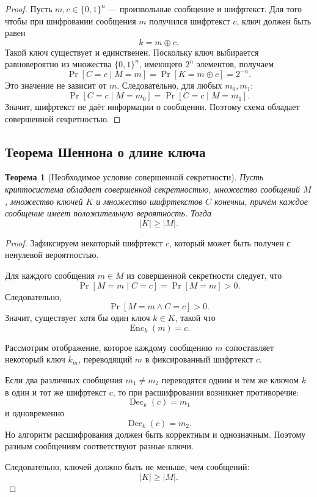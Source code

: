 \documentclass[12pt,a4paper]{article}
\newtheorem{theorem}{Теорема}
\DeclareMathOperator{\Enc}{Enc}
\DeclareMathOperator{\Dec}{Dec}
\begin{document}
\begin{proof}
Пусть $m,c \in \{0,1\}^n$ --- произвольные сообщение и шифртекст. Для того чтобы при шифровании сообщения $m$ получился шифртекст $c$, ключ должен быть равен
\[
    k = m \oplus c.
\]
Такой ключ существует и единственен. Поскольку ключ выбирается равновероятно из множества $\{0,1\}^n$, имеющего $2^n$ элементов, получаем
\[
    \Pr[C=c \mid M=m] = \Pr[K=m\oplus c] = 2^{-n}.
\]
Это значение не зависит от $m$. Следовательно, для любых $m_0,m_1$:
\[
    \Pr[C=c \mid M=m_0] = \Pr[C=c \mid M=m_1].
\]
Значит, шифртекст не даёт информации о сообщении. Поэтому схема обладает совершенной секретностью.
\end{proof}

\subsection{Теорема Шеннона о длине ключа}

\begin{theorem}[Необходимое условие совершенной секретности]
Пусть криптосистема обладает совершенной секретностью, множество сообщений $M$, множество ключей $K$ и множество шифртекстов $C$ конечны, причём каждое сообщение имеет положительную вероятность. Тогда
\[
    |K| \ge |M|.
\]
\end{theorem}

\begin{proof}
Зафиксируем некоторый шифртекст $c$, который может быть получен с ненулевой вероятностью.

Для каждого сообщения $m \in M$ из совершенной секретности следует, что
\[
    \Pr[M=m \mid C=c] = \Pr[M=m] > 0.
\]
Следовательно,
\[
    \Pr[M=m \land C=c] > 0.
\]
Значит, существует хотя бы один ключ $k \in K$, такой что
\[
    \Enc_k(m)=c.
\]

Рассмотрим отображение, которое каждому сообщению $m$ сопоставляет некоторый ключ $k_m$, переводящий $m$ в фиксированный шифртекст $c$.

Если два различных сообщения $m_1 \ne m_2$ переводятся одним и тем же ключом $k$ в один и тот же шифртекст $c$, то при расшифровании возникнет противоречие:
\[
    \Dec_k(c)=m_1
\]
и одновременно
\[
    \Dec_k(c)=m_2.
\]
Но алгоритм расшифрования должен быть корректным и однозначным. Поэтому разным сообщениям соответствуют разные ключи.

Следовательно, ключей должно быть не меньше, чем сообщений:
\[
    |K| \ge |M|.
\]
\end{proof}
\end{document}
